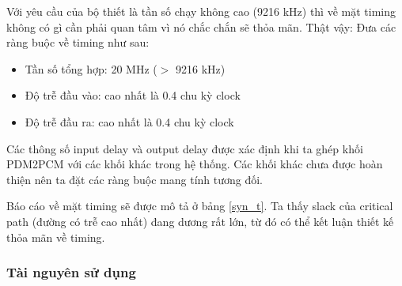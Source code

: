 
Với yêu cầu của bộ thiết là tần số chạy không cao (9216 kHz) thì về mặt timing không có gì cần phải quan tâm vì nó chắc chắn sẽ thỏa mãn. Thật vậy:
Đưa các ràng buộc về timing như sau:
\begin{itemize}
    \item Tần số tổng hợp: 20 MHz ($>$ 9216 kHz)
    \item Độ trễ đầu vào: cao nhất là 0.4 chu kỳ clock
    \item Độ trễ đầu ra: cao nhất là 0.4 chu kỳ clock
\end{itemize}

Các thông số input delay và output delay được xác định khi ta ghép khối PDM2PCM 
với các khối khác trong hệ thống. Các khối khác chưa được hoàn thiện nên ta đặt các ràng buộc mang tính tương đối.

Báo cáo về mặt timing sẽ được mô tả ở bảng \ref{syn_t}. Ta thấy slack của critical path (đường có trễ cao nhất) đang dương rất lớn, từ đó có thể kết luận thiết kế thỏa mãn về timing.
\subsubsection{Tài nguyên sử dụng}

